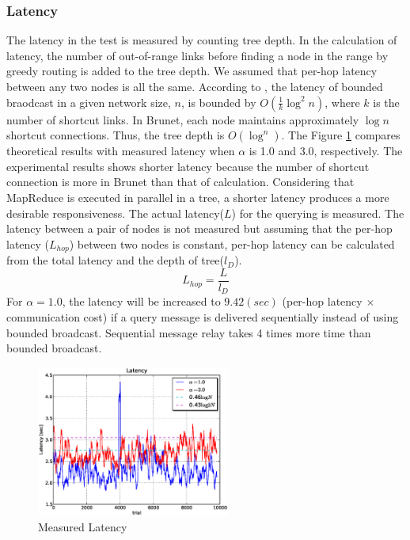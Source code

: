 \documentclass[9.5pt,journal,final,finalsubmission,twocolumn]{IEEEtran}
\begin{document}
\subsubsection{Latency}
The latency in the test is measured by counting tree depth.
In the calculation of latency, the number of out-of-range links before finding a node 
in the range by greedy routing is added to the tree depth.
We assumed that per-hop latency between any two nodes is all the same.
According to \cite{to:deetoo10}, the latency of bounded braodcast in 
a given network size, $n$, is bounded by $O(\frac{1}{k}\log^2{n})$, where $k$ is 
the number of shortcut links. In Brunet, each node maintains approximately
$\log{n}$ shortcut connections. Thus, the tree depth is $O(\log^{n})$.
The Figure \ref{fig:latency} compares theoretical results
with measured latency
when $\alpha$ is 1.0 and 3.0, respectively. The experimental results 
shows shorter latency because the number of shortcut connection 
is more in Brunet than that of calculation.
Considering that MapReduce is executed in parallel in a tree,
a shorter latency produces a more desirable responsiveness.
The actual latency($L$) for the querying is measured. The latency between 
a pair of nodes is not measured but assuming that the per-hop latency
($L_{hop}$) between two nodes is constant, 
per-hop latency can be calculated 
from the total latency and the depth of tree($l_D$).
\[
L_{hop}=\frac{L}{l_D}
\]
For $\alpha=1.0$, the latency will be increased to $9.42(sec)$
(per-hop latency $\times$ communication cost) if a 
query message is delivered sequentially instead of
using bounded broadcast. Sequential message relay takes 4 times more time
than bounded broadcast. 
\begin{figure}[ht]
\centering
\includegraphics[width=2.5in]{plab_latency_sec.eps}
\caption{Measured Latency} \label{fig:latency}
\end{figure}
\end{document}
